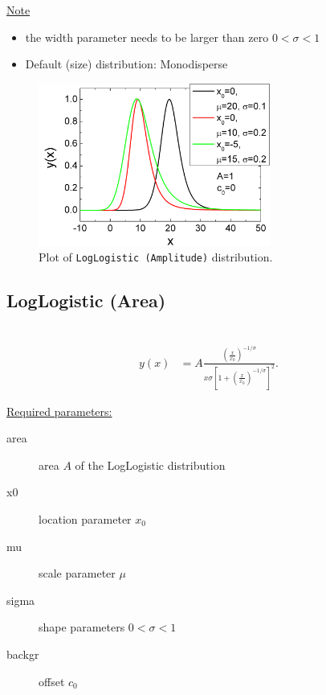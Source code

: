 \uline{Note}
\begin{itemize}
  \item the width parameter needs to be larger than zero $0<\sigma <1$
  \item Default (size) distribution: Monodisperse
\end{itemize}


\begin{figure}[htb]
\begin{center}
\includegraphics[width=0.6824\textwidth]{LogLogisticAmplitude.png}
\end{center}
\caption{Plot of \texttt{LogLogistic (Amplitude)} distribution.}
\label{fig:LogLogisticAmplitude}
\end{figure}

\clearpage
\subsection{LogLogistic (Area)} ~\\
\label{sec:LogLogisticArea}
\begin{align}
y(x) &= A \frac{ \left(\frac{x}{x_0}\right)^{-1/\sigma} } { x\sigma\left[ 1+\left(\frac{x}{x_0}\right)^{-1/\sigma} \right]^2 }.
\end{align}

\uline{Required parameters:}
\begin{description}
    \item[area] area $A$ of the LogLogistic distribution
    \item[x0] location parameter $x_0$
    \item[mu] scale parameter $\mu$
    \item[sigma] shape parameters $0 < \sigma < 1$
    \item[backgr] offset $c_0$
\end{description}

